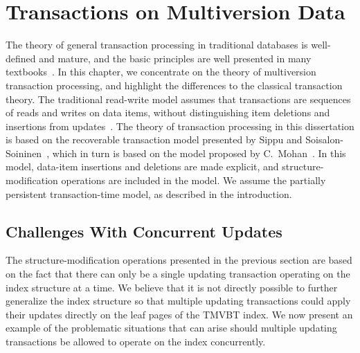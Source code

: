 \chapter{Transactions on Multiversion Data}
\label{chapter:dummy-layout-text}


The theory of general transaction processing in traditional 
databases is well-defined and mature, and the basic principles are
well presented in many
textbooks~\cite{bernstein:1987:cc-n-r,gray:1993:transactionprocessing,papadimitriou:1986:cc-theory}.
In this chapter, we concentrate on the theory of multiversion
transaction processing, and highlight the differences to the classical
transaction theory.
The traditional read-write model assumes that transactions are sequences
of reads and writes on data items, without distinguishing item deletions and
insertions from
updates~\cite{bernstein:1987:cc-n-r,papadimitriou:1986:cc-theory}.
The theory of transaction processing in this dissertation is based on
the recoverable transaction model presented by Sippu and
Soisalon-Soininen~\cite{sippu:2001:theory}, which in turn is based on the
model proposed by C.~Mohan~\cite{mohan:1990:aries-kvl,mohan:1992:aries-im}.
In this model, data-item insertions and deletions are made explicit,
and structure-modification operations are included in the model.
We assume the partially persistent transaction-time model, as
described in the introduction.



\section{Challenges With Concurrent Updates}
\label{sec:tmvbt:multiupdate}

The structure-modification operations presented in the previous section
are based on the fact that there can only be a single updating transaction
operating on the index structure at a time.
We believe that it is not directly possible to further generalize the index
structure so that multiple updating transactions could apply their updates
directly on the leaf pages of the TMVBT index.
We now present an example of the problematic situations that can arise should
multiple updating transactions be allowed to operate on the index
concurrently.

